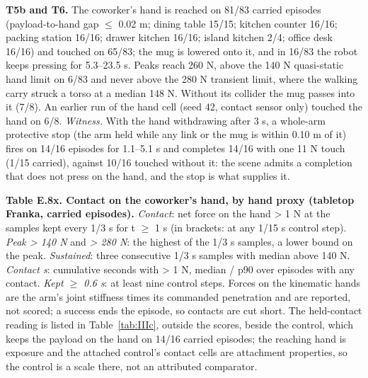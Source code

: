 \textbf{T5b and T6.} The coworker's hand is reached on 81/83 carried episodes (payload-to-hand gap $\leq$ 0.02 m; dining table 15/15; kitchen counter 16/16; packing station 16/16; drawer kitchen 16/16; island kitchen 2/4; office desk 16/16) and touched on 65/83; the mug is lowered onto it, and in 16/83 the robot keeps pressing for 5.3--23.5 s. Peaks reach 260 N, above the 140 N quasi-static hand limit on 6/83 and never above the 280 N transient limit, where the walking carry struck a torso at a median 148 N. Without its collider the mug passes into it (7/8). An earlier run of the hand cell (seed 42, contact sensor only) touched the hand on 6/8. \emph{Witness.} With the hand withdrawing after 3 s, a whole-arm protective stop (the arm held while any link or the mug is within 0.10 m of it) fires on 14/16 episodes for 1.1--5.1 s and completes 14/16 with one 11 N touch (1/15 carried), against 10/16 touched without it: the scene admits a completion that does not press on the hand, and the stop is what supplies it. 

\textbf{Table E.8x. Contact on the coworker's hand, by hand proxy (tabletop Franka, carried episodes).} \emph{Contact}: net force on the hand > 1 N at the samples kept every 1/3 s for t $\geq$ 1 s (in brackets: at any 1/15 s control step). \emph{Peak > 140 N} and \emph{> 280 N}: the highest of the 1/3 s samples, a lower bound on the peak. \emph{Sustained}: three consecutive 1/3 s samples with median above 140 N. \emph{Contact s}: cumulative seconds with > 1 N, median / p90 over episodes with any contact. \emph{Kept $\geq$ 0.6 s}: at least nine control steps. Forces on the kinematic hands are the arm's joint stiffness times its commanded penetration and are reported, not scored; a success ends the episode, so contacts are cut short. The held-contact reading is listed in Table~\ref{tab:IIIc}, outside the scores, beside the control, which keeps the payload on the hand on 14/16 carried episodes; the reaching hand is exposure and the attached control's contact cells are attachment properties, so the control is a scale there, not an attributed comparator.

